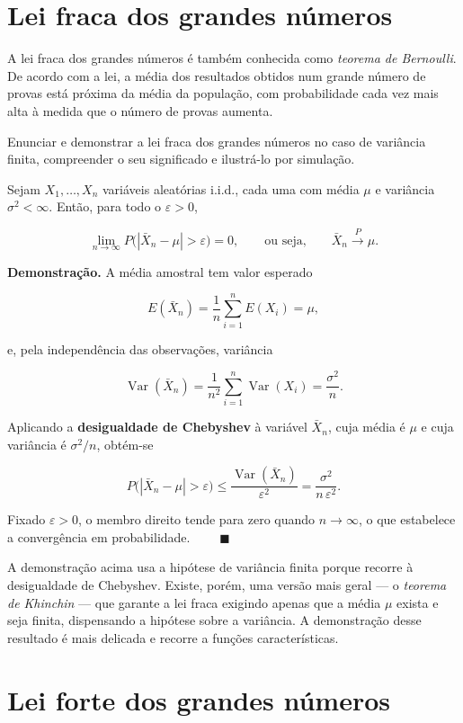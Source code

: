\documentclass[
  portuguese,
  11pt,
  openany]{book}
\begin{document}
\section{Lei fraca dos grandes números}\label{lei-fraca-dos-grandes-nuxfameros}

A lei fraca dos grandes números é também conhecida como \emph{teorema de Bernoulli}.
De acordo com a lei, a média dos resultados obtidos num grande número de provas
está próxima da média da população, com probabilidade cada vez mais alta à
medida que o número de provas aumenta.

Enunciar e demonstrar a lei fraca dos grandes números no caso de variância
finita, compreender o seu significado e ilustrá-lo por simulação.

Sejam \(X_1, \ldots, X_n\) variáveis aleatórias i.i.d., cada uma com média \(\mu\) e
variância \(\sigma^2 < \infty\). Então, para todo o \(\varepsilon > 0\),

\[
\lim_{n \to \infty} P\big(|\bar{X}_n - \mu| > \varepsilon\big) = 0,
\qquad \text{ou seja,} \qquad
\bar{X}_n \xrightarrow{P} \mu.
\]

\textbf{Demonstração.} A média amostral tem valor esperado

\[
E(\bar{X}_n) = \frac{1}{n}\sum_{i=1}^{n} E(X_i) = \mu,
\]

e, pela independência das observações, variância

\[
\operatorname{Var}(\bar{X}_n)
= \frac{1}{n^2}\sum_{i=1}^{n}\operatorname{Var}(X_i)
= \frac{\sigma^2}{n}.
\]

Aplicando a \textbf{desigualdade de Chebyshev} à variável \(\bar{X}_n\), cuja média é
\(\mu\) e cuja variância é \(\sigma^2/n\), obtém-se

\[
P\big(|\bar{X}_n - \mu| > \varepsilon\big)
\leq \frac{\operatorname{Var}(\bar{X}_n)}{\varepsilon^2}
= \frac{\sigma^2}{n\,\varepsilon^2}.
\]

Fixado \(\varepsilon > 0\), o membro direito tende para zero quando
\(n \to \infty\), o que estabelece a convergência em probabilidade. \(\qquad\blacksquare\)

A demonstração acima usa a hipótese de variância finita porque recorre à
desigualdade de Chebyshev. Existe, porém, uma versão mais geral --- o \emph{teorema de
Khinchin} --- que garante a lei fraca exigindo apenas que a média \(\mu\) exista e
seja finita, dispensando a hipótese sobre a variância. A demonstração desse
resultado é mais delicada e recorre a funções características.

\section{Lei forte dos grandes números}\label{lei-forte-dos-grandes-nuxfameros}
\end{document}

